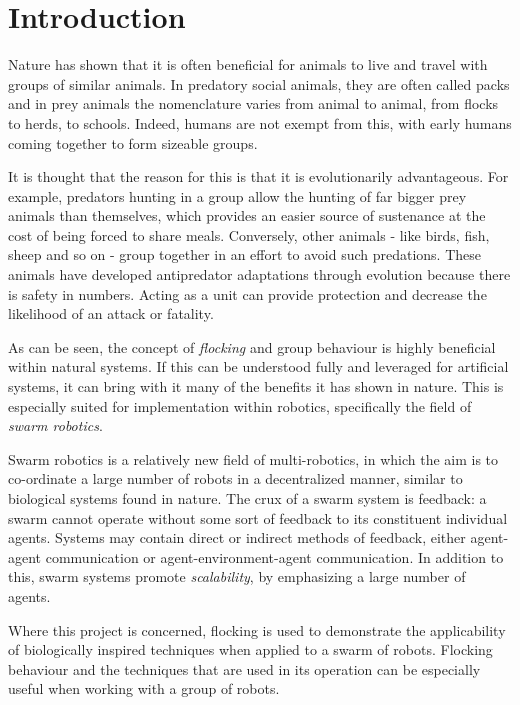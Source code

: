 \chapter{Introduction}
\label{chap:Introduction}

Nature has shown that it is often beneficial for animals to live and travel with groups of similar animals. In predatory social animals, they are often called packs and in prey animals the nomenclature varies from animal to animal, from flocks to herds, to schools. Indeed, humans are not exempt from this, with early humans coming together to form sizeable groups. 

It is thought that the reason for this is that it is evolutionarily advantageous. For example, predators hunting in a group allow the hunting of far bigger prey animals than themselves, which provides an easier source of sustenance at the cost of being forced to share meals. \cite{social-predation} Conversely, other animals - like birds, fish, sheep and so on - group together in an effort to avoid such predations. These animals have developed antipredator adaptations through evolution because there is safety in numbers. Acting as a unit can provide protection and decrease the likelihood of an attack or fatality.

As can be seen, the concept of \textit{flocking} and group behaviour is highly beneficial within natural systems. If this can be understood fully and leveraged for artificial systems, it can bring with it many of the benefits it has shown in nature. This is especially suited for implementation within robotics, specifically the field of \textit{swarm robotics}.

Swarm robotics is a relatively new field of multi-robotics, in which the aim is to co-ordinate a large number of robots in a decentralized manner, similar to biological systems found in nature. The crux of a swarm system is feedback: a swarm cannot operate without some sort of feedback to its constituent individual agents. Systems may contain direct or indirect methods of feedback, either agent-agent communication or agent-environment-agent communication. In addition to this, swarm systems promote \textit{scalability}, by emphasizing a large number of agents.

Where this project is concerned, flocking is used to demonstrate the applicability of biologically inspired techniques when applied to a swarm of robots. Flocking behaviour and the techniques that are used in its operation can be especially useful when working with a group of robots.

